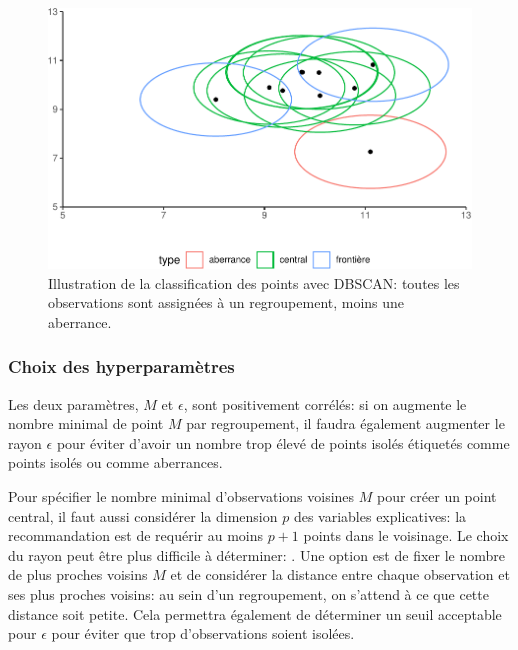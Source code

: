 \documentclass[
  11pt,
  letterpaper,
]{book}
\theoremstyle{definition}
\theoremstyle{remark}
\begin{document}
\begin{figure}[ht!]

{\centering \includegraphics[width=1\textwidth,height=\textheight]{./03-regroupements_files/figure-pdf/fig-dbscan1-1.pdf}

}

\caption{\label{fig-dbscan1}Illustration de la classification des points
avec DBSCAN: toutes les observations sont assignées à un regroupement,
moins une aberrance.}

\end{figure}

\hypertarget{choix-des-hyperparamuxe8tres-1}{%
\subsubsection{Choix des
hyperparamètres}\label{choix-des-hyperparamuxe8tres-1}}

Les deux paramètres, \(M\) et \(\epsilon\), sont positivement corrélés:
si on augmente le nombre minimal de point \(M\) par regroupement, il
faudra également augmenter le rayon \(\epsilon\) pour éviter d'avoir un
nombre trop élevé de points isolés étiquetés comme points isolés ou
comme aberrances.

Pour spécifier le nombre minimal d'observations voisines \(M\) pour
créer un point central, il faut aussi considérer la dimension \(p\) des
variables explicatives: la recommandation est de requérir au moins
\(p+1\) points dans le voisinage. Le choix du rayon peut être plus
difficile à déterminer: . Une option est de fixer le nombre de plus
proches voisins \(M\) et de considérer la distance entre chaque
observation et ses plus proches voisins: au sein d'un regroupement, on
s'attend à ce que cette distance soit petite. Cela permettra également
de déterminer un seuil acceptable pour \(\epsilon\) pour éviter que trop
d'observations soient isolées.
\end{document}
